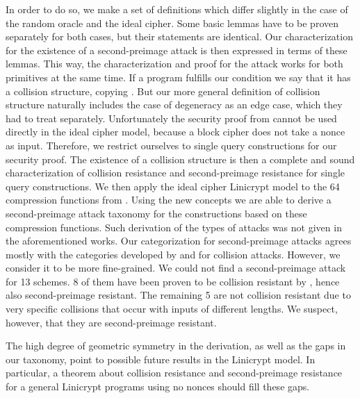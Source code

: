 In order to do so, we make a set of definitions which differ slightly in the case of the random oracle and the ideal cipher.
Some basic lemmas have to be proven separately for both cases, but their statements are identical.
Our characterization for the existence of a second-preimage attack is then expressed in terms of these lemmas.
This way, the characterization and proof for the attack works for both primitives at the same time.
If a program fulfills our condition we say that it has a collision structure, copying \cite{TCC:McQSwoRos19}.
But our more general definition of collision structure naturally includes the case of degeneracy as an edge case,
which they had to treat separately.
Unfortunately the security proof from \cite{TCC:McQSwoRos19} cannot be used directly in the ideal cipher model,
because a block cipher does not take a nonce as input.
Therefore, we restrict ourselves to single query constructions for our security proof.
The existence of a collision structure is then a complete and sound characterization of collision resistance and second-preimage resistance for single query constructions.
We then apply the ideal cipher Linicrypt model to the 64 compression functions from \cite{C:PreGovVan93}.
Using the new concepts we are able to derive a second-preimage attack taxonomy for the \MD constructions based on these compression functions.
Such derivation of the types of attacks was not given in the aforementioned works.
Our categorization for second-preimage attacks agrees mostly with the categories developed by \cite{C:PreGovVan93} and \cite{C:BlaRogShr02} for collision attacks.
However, we consider it to be more fine-grained.
We could not find a second-preimage attack for 13 schemes.
8 of them have been proven to be collision resistant by \cite{C:BlaRogShr02},
hence also second-preimage resistant.
The remaining 5 are not collision resistant due to very specific collisions that occur with inputs of different lengths.
We suspect, however, that they are second-preimage resistant.

The high degree of geometric symmetry in the derivation,
as well as the gaps in our taxonomy, point to possible future results in the Linicrypt model.
In particular,
a theorem about collision resistance and second-preimage resistance for a general Linicrypt programs using no nonces should fill these gaps.

